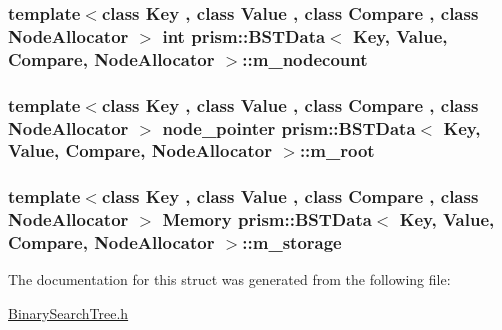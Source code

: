 \subsubsection[{\texorpdfstring{m\+\_\+nodecount}{m_nodecount}}]{\setlength{\rightskip}{0pt plus 5cm}template$<$class Key , class Value , class Compare , class Node\+Allocator $>$ int {\bf prism\+::\+B\+S\+T\+Data}$<$ Key, Value, Compare, Node\+Allocator $>$\+::m\+\_\+nodecount}\hypertarget{structprism_1_1_b_s_t_data_a99e476b247ff0230b1ce077634e5b445}{}\label{structprism_1_1_b_s_t_data_a99e476b247ff0230b1ce077634e5b445}
\subsubsection[{\texorpdfstring{m\+\_\+root}{m_root}}]{\setlength{\rightskip}{0pt plus 5cm}template$<$class Key , class Value , class Compare , class Node\+Allocator $>$ {\bf node\+\_\+pointer} {\bf prism\+::\+B\+S\+T\+Data}$<$ Key, Value, Compare, Node\+Allocator $>$\+::m\+\_\+root}\hypertarget{structprism_1_1_b_s_t_data_afb5f96097c1713e1d86b1c38d831d5fe}{}\label{structprism_1_1_b_s_t_data_afb5f96097c1713e1d86b1c38d831d5fe}
\subsubsection[{\texorpdfstring{m\+\_\+storage}{m_storage}}]{\setlength{\rightskip}{0pt plus 5cm}template$<$class Key , class Value , class Compare , class Node\+Allocator $>$ {\bf Memory} {\bf prism\+::\+B\+S\+T\+Data}$<$ Key, Value, Compare, Node\+Allocator $>$\+::m\+\_\+storage}\hypertarget{structprism_1_1_b_s_t_data_aa6f2a5e9475beddec8574677bb8ee997}{}\label{structprism_1_1_b_s_t_data_aa6f2a5e9475beddec8574677bb8ee997}


The documentation for this struct was generated from the following file\+:\begin{DoxyCompactItemize}
\item 
\hyperlink{_binary_search_tree_8h}{Binary\+Search\+Tree.\+h}\end{DoxyCompactItemize}

